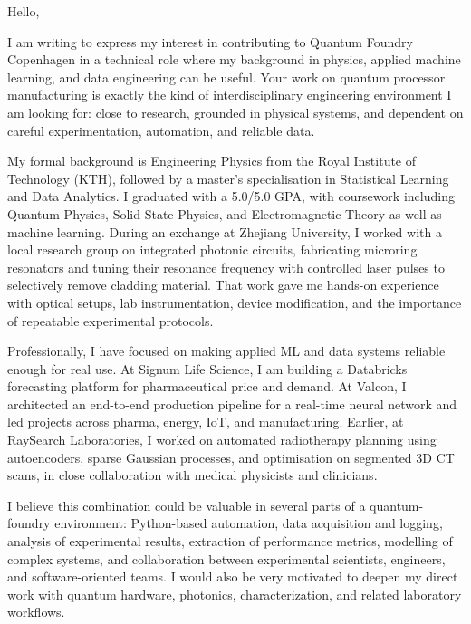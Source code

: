 \documentclass[11pt,a4paper]{moderncv}
\begin{document}
\makecvtitle
Hello,

\vspace*{2em}
I am writing to express my interest in contributing to Quantum Foundry Copenhagen in a technical role where my background in physics, applied machine learning, and data engineering can be useful. Your work on quantum processor manufacturing is exactly the kind of interdisciplinary engineering environment I am looking for: close to research, grounded in physical systems, and dependent on careful experimentation, automation, and reliable data.

\hspace*{2em}
My formal background is Engineering Physics from the Royal Institute of Technology (KTH), followed by a master's specialisation in Statistical Learning and Data Analytics. I graduated with a 5.0/5.0 GPA, with coursework including Quantum Physics, Solid State Physics, and Electromagnetic Theory as well as machine learning. During an exchange at Zhejiang University, I worked with a local research group on integrated photonic circuits, fabricating microring resonators and tuning their resonance frequency with controlled laser pulses to selectively remove cladding material. That work gave me hands-on experience with optical setups, lab instrumentation, device modification, and the importance of repeatable experimental protocols.

\hspace*{2em}
Professionally, I have focused on making applied ML and data systems reliable enough for real use. At Signum Life Science, I am building a Databricks forecasting platform for pharmaceutical price and demand. At Valcon, I architected an end-to-end production pipeline for a real-time neural network and led projects across pharma, energy, IoT, and manufacturing. Earlier, at RaySearch Laboratories, I worked on automated radiotherapy planning using autoencoders, sparse Gaussian processes, and optimisation on segmented 3D CT scans, in close collaboration with medical physicists and clinicians.

\hspace*{2em}
I believe this combination could be valuable in several parts of a quantum-foundry environment: Python-based automation, data acquisition and logging, analysis of experimental results, extraction of performance metrics, modelling of complex systems, and collaboration between experimental scientists, engineers, and software-oriented teams. I would also be very motivated to deepen my direct work with quantum hardware, photonics, characterization, and related laboratory workflows.
\end{document}
